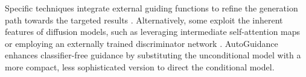 Specific techniques integrate external guiding functions to refine the generation path towards the targeted results \cite{bansal2023universal}. Alternatively, some exploit the inherent features of diffusion models, such as leveraging intermediate self-attention maps \citep{hong2023improving} or employing an externally trained discriminator network \citep{kim2022refining}. AutoGuidance \citep{karras2024guiding} enhances classifier-free guidance by substituting the unconditional model with a more compact, less sophisticated version to direct the conditional model.

